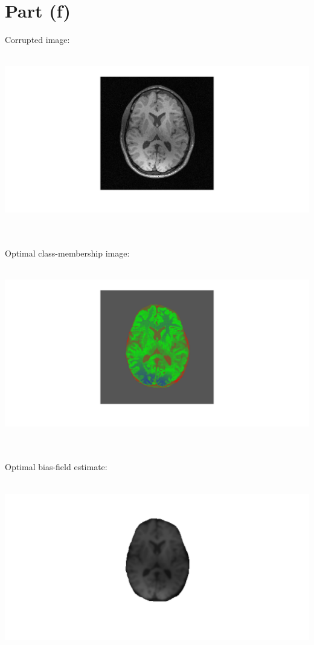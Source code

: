 \documentclass[11pt]{article}
\begin{document}
\section*{Part (f)}
Corrupted image: \\ \\
\centerline{\includegraphics[scale=0.5]{corruptImage}} \\ \\
Optimal class-membership image: \\ \\
\centerline{\includegraphics[scale=0.5]{mems}} \\ \\
Optimal bias-field estimate: \\ \\
\centerline{\includegraphics[scale=0.5]{bias}} \\ \\
\end{document}
